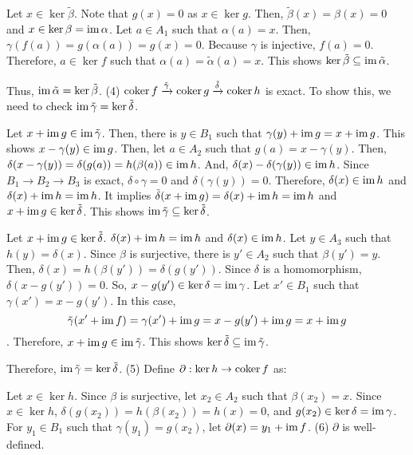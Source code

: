 Let \(x \in \ker\tilde\beta\).
Note that \(g(x) = 0\) as \(x \in \ker g\).
Then, \(\tilde\beta(x) = \beta(x) = 0\) and \(x \in \ker\beta = \textnormal{im}\,\alpha\).
Let \(a \in A_1\) such that \(\alpha(a) = x\).
Then, \(\gamma(f(a)) = g(\alpha(a)) = g(x) = 0\).
Because \(\gamma\) is injective, \(f(a) = 0\).
Therefore, \(a \in \ker f\) such that \(\alpha(a) = \tilde\alpha(a) = x\).
This shows \(\ker\tilde\beta \subseteq \textnormal{im}\,\tilde\alpha\).

Thus, \(\textnormal{im}\,\tilde\alpha = \ker\tilde\beta\).
\br
\noindent
(4)
\(\textnormal{coker}\, f \xrightarrow{\tilde\gamma} \textnormal{coker}\, g \xrightarrow{\tilde\delta} \textnormal{coker}\, h\) is exact.
To show this, we need to check \(\textnormal{im}\, \tilde\gamma = \ker \tilde\delta\).

Let \(x + \textnormal{im}\, g \in \textnormal{im}\,\tilde\gamma\).
Then, there is \(y \in B_1\) such that \(\gamma(y) + \textnormal{im}\, g = x + \textnormal{im}\, g\).
This shows \(x - \gamma(y) \in \textnormal{im}\, g\).
Then, let \(a \in A_2\) such that \(g(a) = x - \gamma(y)\).
Then, \(\delta(x - \gamma(y)) = \delta(g(a)) = h(\beta(a)) \in \textnormal{im}\, h\).
And,
\(\delta(x) - \delta(\gamma(y)) \in \textnormal{im}\, h\).
Since \(B_1 \to B_2 \to B_3\) is exact, \(\delta \circ \gamma = 0\) and \(\delta(\gamma(y)) = 0\).
Therefore, \(\delta(x) \in \textnormal{im}\, h\) and \(\delta(x) + \textnormal{im}\, h = \textnormal{im}\, h\).
It implies \(\tilde\delta(x + \textnormal{im}\, g) = \delta(x) + \textnormal{im}\, h = \textnormal{im}\, h\)
and \(x + \textnormal{im}\, g \in \ker\tilde\delta\).
This shows \(\textnormal{im}\,\tilde\gamma \subseteq \ker\tilde\delta\).

Let \(x + \textnormal{im}\, g \in \ker\tilde\delta\).
\(\delta(x) + \textnormal{im}\, h = \textnormal{im}\, h\) and \(\delta(x) \in \textnormal{im}\, h\).
Let \(y \in A_3\) such that \(h(y) = \delta(x)\).
Since \(\beta\) is surjective, there is \(y' \in A_2\) such that \(\beta(y') = y\).
Then, \(\delta(x) = h(\beta(y')) = \delta(g(y'))\).
Since \(\delta\) is a homomorphism,
\(\delta(x - g(y')) = 0\).
So, \(x - g(y') \in \ker\delta = \textnormal{im}\,\gamma\).
Let \(x' \in B_1\) such that \(\gamma(x') = x - g(y')\).
In this case,
\[\tilde\gamma(x' + \textnormal{im}\, f) = \gamma(x') + \textnormal{im}\, g = x - g(y') + \textnormal{im}\, g = x + \textnormal{im}\, g\].
Therefore, \(x + \textnormal{im}\, g \in \textnormal{im}\,\tilde\gamma\).
This shows \(\ker\tilde\delta \subseteq \textnormal{im}\,\tilde\gamma\).

Therefore, \(\textnormal{im}\,\tilde\gamma = \ker\tilde\delta\).
\br
\noindent
(5) Define \(\partial: \ker h \to \textnormal{coker}\, f\) as:

Let \(x \in \ker h\). Since \(\beta\) is surjective, let \(x_2 \in A_2\) such that \(\beta(x_2) = x\).
Since \(x \in \ker h\),
\(\delta(g(x_2)) = h(\beta(x_2)) = h(x) = 0\),
and \(g(x_2) \in \ker \delta = \textnormal{im}\, \gamma\).
For \(y_1 \in B_1\) such that \(\gamma(y_1) = g(x_2)\), let \(\partial(x) = y_1 + \textnormal{im}\, f\).
\br
\noindent
(6) \(\partial\) is well-defined.

